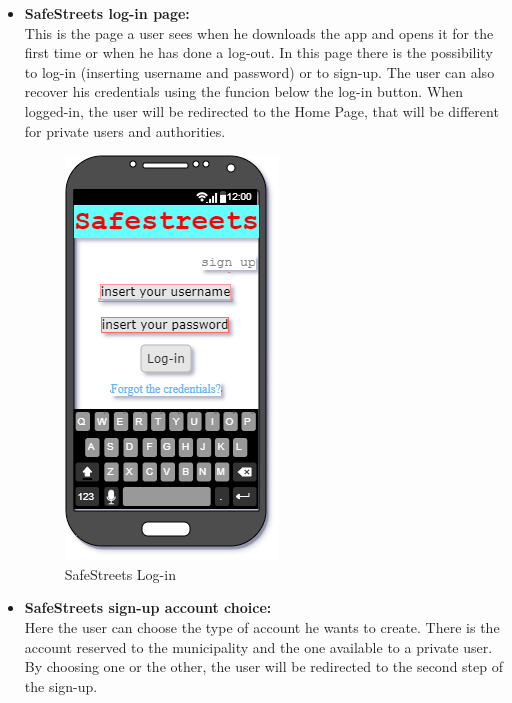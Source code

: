 \documentclass[titlepage]{article}
\begin{document}
\begin{itemize}
\begin{itemize}
	\item \textbf{SafeStreets log-in page:}\\
	This is the page a user sees when he downloads the app and opens it for the first time or when he has done a log-out. In this page there is the possibility to log-in (inserting username and password) or to sign-up. The user can also recover his credentials using the funcion below the log-in button. When logged-in, the user will be redirected to the Home Page, that will be different for private users and authorities.
	\begin{figure}[h]
	\includegraphics[scale=0.7]{Mockups/log in.png}
	\centering
	\caption{SafeStreets Log-in}
	\end{figure}
	\FloatBarrier
	
	
	\newpage
	
	\item \textbf{SafeStreets sign-up account choice:}\\
	
	Here the user can choose the type of account he wants to create. There is the account reserved to the municipality and the one available to a private user. By choosing one or the other, the user will be redirected to the second step of the sign-up.
	

\end{itemize}
\end{itemize}
\end{document}

